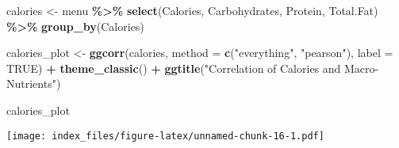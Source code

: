 \documentclass[
]{article}
\newenvironment{Shaded}{\begin{snugshade}}{\end{snugshade}}
\newcommand{\AttributeTok}[1]{\textcolor[rgb]{0.13,0.29,0.53}{#1}}
\newcommand{\ConstantTok}[1]{\textcolor[rgb]{0.56,0.35,0.01}{#1}}
\newcommand{\FunctionTok}[1]{\textcolor[rgb]{0.13,0.29,0.53}{\textbf{#1}}}
\newcommand{\NormalTok}[1]{#1}
\newcommand{\OtherTok}[1]{\textcolor[rgb]{0.56,0.35,0.01}{#1}}
\newcommand{\SpecialCharTok}[1]{\textcolor[rgb]{0.81,0.36,0.00}{\textbf{#1}}}
\newcommand{\StringTok}[1]{\textcolor[rgb]{0.31,0.60,0.02}{#1}}
\begin{document}
\begin{Shaded}
\begin{Highlighting}[]
\NormalTok{calories }\OtherTok{\textless{}{-}}\NormalTok{ menu }\SpecialCharTok{\%\textgreater{}\%}
  \FunctionTok{select}\NormalTok{(Calories,}
\NormalTok{         Carbohydrates, }
\NormalTok{         Protein,}
\NormalTok{         Total.Fat) }\SpecialCharTok{\%\textgreater{}\%} 
  \FunctionTok{group\_by}\NormalTok{(Calories)}

\NormalTok{calories\_plot }\OtherTok{\textless{}{-}} \FunctionTok{ggcorr}\NormalTok{(calories,}
       \AttributeTok{method =}  \FunctionTok{c}\NormalTok{(}\StringTok{"everything"}\NormalTok{, }\StringTok{"pearson"}\NormalTok{),}
       \AttributeTok{label =} \ConstantTok{TRUE}\NormalTok{)  }\SpecialCharTok{+} \FunctionTok{theme\_classic}\NormalTok{() }\SpecialCharTok{+}  \FunctionTok{ggtitle}\NormalTok{(}\StringTok{"Correlation of Calories and Macro{-}Nutrients"}\NormalTok{)}

\NormalTok{calories\_plot}
\end{Highlighting}
\end{Shaded}

\texttt{[image: index\_files/figure-latex/unnamed-chunk-16-1.pdf]}
\end{document}
